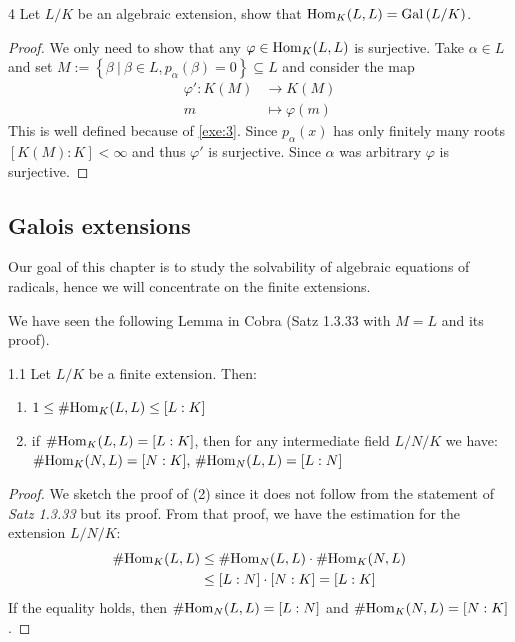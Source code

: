 \documentclass[twoside = false,	%
		headsepline,		%
		parskip = true,
		]{scrbook}						%
\begin{document}
        \begin{exercise}{}{4}
            Let $L/K$ be an algebraic extension, show that $\mathrm{Hom}_K(L,L) = \mathrm{Gal}\left( L/K\right)$.
        \end{exercise}
        \begin{proof}
            We only need to show that any $\varphi \in \mathrm{Hom}_K(L,L)$ is surjective. Take $\alpha \in L$ and set $M:= \left\{\beta \ | \ \beta \in L, p_\alpha(\beta) = 0 \right\} \subseteq L$ and consider the map
            \begin{align*}
                \varphi': K(M) &\rightarrow K(M) \\
                            m &\mapsto \varphi(m)
            \end{align*}
        This is well defined because of \ref{exe:3}. Since $p_\alpha(x)$ has only finitely many roots $[K(M):K] < \infty$ and thus $\varphi'$ is surjective. Since $\alpha$ was arbitrary $\varphi$ is surjective.
        \end{proof}
            
    \subsection{Galois extensions}
        Our goal of this chapter is to study the solvability of algebraic equations of radicals, hence we will concentrate on the finite extensions.
        
        We have seen the following Lemma in Cobra \cite{Cobra} (Satz 1.3.33 with $M=L$ and its proof).
        \begin{lemma}{}{1.1}
            Let $L/K$ be a finite extension. Then:
            \begin{enumerate}
                \item $1 \leq \# \mathrm{Hom}_K(L,L) \leq [L:K]$
                \item if $\#\mathrm{Hom}_K(L,L) = [L:K]$, then for any intermediate field $L/N/K$ we have:\\ $\#\mathrm{Hom}_K(N,L) = [N:K], \, \#\mathrm{Hom}_N(L,L) = [L:N]$
            \end{enumerate}
        \end{lemma}
        \begin{proof}
            We sketch the proof of (2) since it does not follow from the statement of \textit{Satz 1.3.33} but its proof. From that proof, we have the estimation for the extension $L/N/K$:
            \begin{align*}
                \#\mathrm{Hom}_K(L,L) &\leq \#\mathrm{Hom}_N(L,L) \cdot \# \mathrm{Hom}_K(N,L) \\
                &\leq [L:N] \cdot [N:K] = [L:K]
            \end{align*}
            If the equality holds, then $\#\mathrm{Hom}_N(L,L) = [L:N]$ and $\#\mathrm{Hom}_K(N,L) = [N:K]$.
        \end{proof}
        
\end{document}
